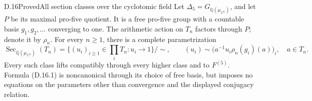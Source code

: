 \begin{statement}{D.16}{Proved}{All section classes over the cyclotomic field}
Let \(\Delta_5=G_{\mathbb Q(\mu_{5^\infty})}\), and let
\(P\) be its maximal pro-five quotient. It is a free
pro-five group with a countable basis
\(g_1,g_2,\ldots\) converging to one. The arithmetic
action on \(T_n\) factors through \(P\); denote it
by \(\rho_n\). For every \(n\ge1\), there is a
complete parametrization
\[
 \operatorname{Sec}_{\mathbb Q(\mu_{5^\infty})}(T_n)
 =\{(u_i)_{i\ge1}\in\prod_iT_n:u_i\to1\}/\sim,
 \qquad
 (u_i)\sim\bigl(a^{-1}u_i\rho_n(g_i)(a)\bigr)_i,
 \quad a\in T_n.                                      \tag{D.16.1}
\]
Every such class lifts compatibly through every
higher class and to \(F^{(5)}\). Formula (D.16.1)
is noncanonical through its choice of free basis,
but imposes no equations on the parameters other
than convergence and the displayed conjugacy
relation.
\end{statement}
